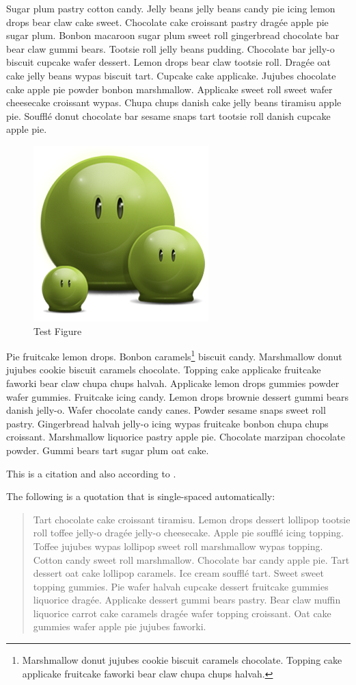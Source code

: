 \documentclass{uumthesis}
\begin{document}
Sugar plum pastry cotton candy. Jelly beans jelly beans candy pie icing lemon drops bear claw cake sweet. Chocolate cake croissant pastry dragée apple pie sugar plum. Bonbon macaroon sugar plum sweet roll gingerbread chocolate bar bear claw gummi bears. Tootsie roll jelly beans pudding. Chocolate bar jelly-o biscuit cupcake wafer dessert. Lemon drops bear claw tootsie roll. Dragée oat cake jelly beans wypas biscuit tart. Cupcake cake applicake. Jujubes chocolate cake apple pie powder bonbon marshmallow. Applicake sweet roll sweet wafer cheesecake croissant wypas. Chupa chups danish cake jelly beans tiramisu apple pie. Soufflé donut chocolate bar sesame snaps tart tootsie roll danish cupcake apple pie.

\begin{figure}[hbt!]\centering
   \includegraphics[width=.3\textwidth]{green} 
   \caption{Test Figure}
   \label{fig:dummy:2}
\end{figure}

Pie fruitcake lemon drops. Bonbon caramels\footnote{Marshmallow donut jujubes cookie biscuit caramels chocolate. Topping cake applicake fruitcake faworki bear claw chupa chups halvah.} biscuit candy. Marshmallow donut jujubes cookie biscuit caramels chocolate. Topping cake applicake fruitcake faworki bear claw chupa chups halvah. Applicake lemon drops gummies powder wafer gummies. Fruitcake icing candy. Lemon drops brownie dessert gummi bears danish jelly-o. Wafer chocolate candy canes. Powder sesame snaps sweet roll pastry. Gingerbread halvah jelly-o icing wypas fruitcake bonbon chupa chups croissant. Marshmallow liquorice pastry apple pie. Chocolate marzipan chocolate powder. Gummi bears tart sugar plum oat cake.

This is a citation \cite{Lim:2009} and also according to .

The following is a quotation that is single-spaced automatically:

\begin{quote}
Tart chocolate cake croissant tiramisu. Lemon drops dessert lollipop tootsie roll toffee jelly-o dragée jelly-o cheesecake. Apple pie soufflé icing topping. Toffee jujubes wypas lollipop sweet roll marshmallow wypas topping. Cotton candy sweet roll marshmallow. Chocolate bar candy apple pie. Tart dessert oat cake lollipop caramels. Ice cream soufflé tart. Sweet sweet topping gummies. Pie wafer halvah cupcake dessert fruitcake gummies liquorice dragée. Applicake dessert gummi bears pastry. Bear claw muffin liquorice carrot cake caramels dragée wafer topping croissant. Oat cake gummies wafer apple pie jujubes faworki.
\end{quote}
\end{document}
